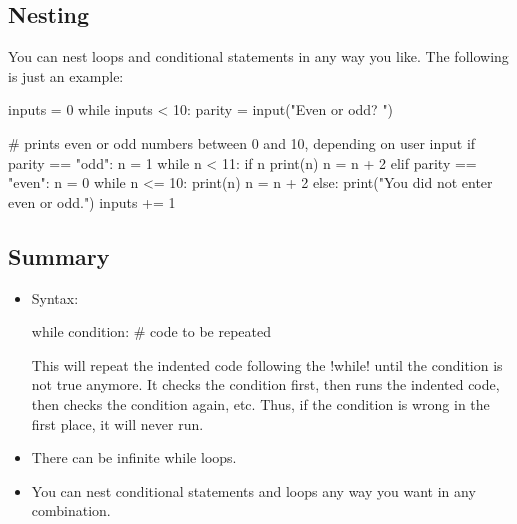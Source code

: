 \documentclass[11pt]{cselabheader}
\begin{document}
\subsection{Nesting}

You can nest loops and conditional statements in any way you
like. The following is just an example:

\begin{python3code}
inputs = 0
while inputs < 10:
    parity = input("Even or odd? ")

    # prints even or odd numbers between 0 and 10, depending on user input
    if parity == "odd":
        n = 1
        while n < 11:
            if n %
                print(n)
            n = n + 2
    elif parity == "even":
        n = 0
        while n <= 10:
            print(n)
            n = n + 2
    else:
        print("You did not enter even or odd.")
    inputs += 1
\end{python3code}

\subsection{Summary}

\begin{itemize}
    \item Syntax:

      \begin{python3code}
while condition:
    # code to be repeated
      \end{python3code}

    This will repeat the indented code following the \pythoninline!while! until
    the condition is not true anymore. It checks the condition first, then runs
    the indented code, then checks the condition again, etc. Thus, if the
    condition is wrong in the first place, it will never run.

%
%

  \item There can be infinite while loops.
  \item You can nest conditional statements and loops any way you want in any
    combination.
\end{itemize}
\end{document}
